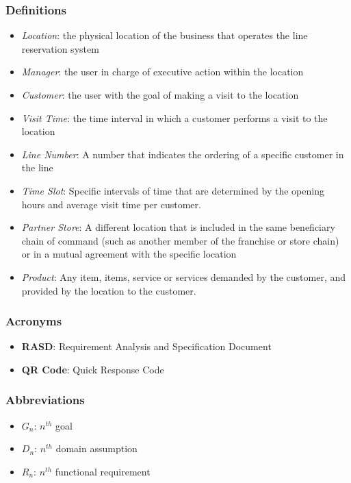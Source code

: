 \subsubsection{Definitions}
\begin{itemize}
    \item \textit{Location}: the physical location of the business that operates the line reservation system
    \item \textit{Manager}: the user in charge of executive action within the location
    \item \textit{Customer}: the user with the goal of making a visit to the location
    \item \textit{Visit Time}: the time interval in which a customer performs a visit to the location
    \item \textit{Line Number}: A number that indicates the ordering of a specific customer in the line
    \item \textit{Time Slot}: Specific intervals of time that are determined by the opening hours and average visit time per customer.
    \item \textit{Partner Store}: A different location that is included in the same beneficiary chain of command (such as another member of the franchise or store chain) or in a mutual agreement with the specific location
    \item \textit{Product}: Any item, items, service or services demanded by the customer, and provided by the location to the customer.
\end{itemize}
\subsubsection{Acronyms}
\begin{itemize}
    \item \textbf{RASD}: Requirement Analysis and Specification Document
    \item \textbf{QR Code}: Quick Response Code
\end{itemize}
\subsubsection{Abbreviations}
\begin{itemize}
    \item \textbf{$G_n$}: $n^{th}$ goal
    \item \textbf{$D_n$}: $n^{th}$ domain assumption
    \item \textbf{$R_n$}: $n^{th}$ functional requirement
\end{itemize}
